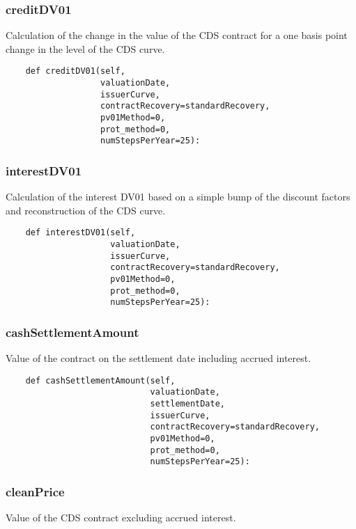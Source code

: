 \documentclass[twoside,11pt]{book}
\begin{document}
\subsubsection*{{\bf creditDV01}}
Calculation of the change in the value of the CDS contract for a  one basis point change in the level of the CDS curve. 

\begin{lstlisting}
    def creditDV01(self,
                   valuationDate,
                   issuerCurve,
                   contractRecovery=standardRecovery,
                   pv01Method=0,
                   prot_method=0,
                   numStepsPerYear=25):
\end{lstlisting}

\subsubsection*{{\bf interestDV01}}
Calculation of the interest DV01 based on a simple bump of  the discount factors and reconstruction of the CDS curve.  

\begin{lstlisting}
    def interestDV01(self,
                     valuationDate,
                     issuerCurve,
                     contractRecovery=standardRecovery,
                     pv01Method=0,
                     prot_method=0,
                     numStepsPerYear=25):
\end{lstlisting}

\subsubsection*{{\bf cashSettlementAmount}}
Value of the contract on the settlement date including accrued interest.  

\begin{lstlisting}
    def cashSettlementAmount(self,
                             valuationDate,
                             settlementDate,
                             issuerCurve,
                             contractRecovery=standardRecovery,
                             pv01Method=0,
                             prot_method=0,
                             numStepsPerYear=25):
\end{lstlisting}

\subsubsection*{{\bf cleanPrice}}
Value of the CDS contract excluding accrued interest.  
\end{document}
